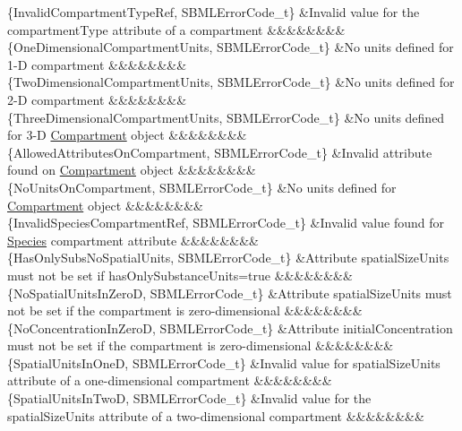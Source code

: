 \begin{DoxyParagraph}{}
\begin{longtabu}
\{Invalid\+Compartment\+Type\+Ref, S\+B\+M\+L\+Error\+Code\+\_\+t\} &Invalid value for the \textquotesingle{}compartment\+Type\textquotesingle{} attribute of a compartment &&&&&&&&\\
\{One\+Dimensional\+Compartment\+Units, S\+B\+M\+L\+Error\+Code\+\_\+t\} &No units defined for 1-\/D compartment &&&&&&&&\\
\{Two\+Dimensional\+Compartment\+Units, S\+B\+M\+L\+Error\+Code\+\_\+t\} &No units defined for 2-\/D compartment &&&&&&&&\\
\{Three\+Dimensional\+Compartment\+Units, S\+B\+M\+L\+Error\+Code\+\_\+t\} &No units defined for 3-\/D \hyperlink{class_compartment}{Compartment} object &&&&&&&&\\
\{Allowed\+Attributes\+On\+Compartment, S\+B\+M\+L\+Error\+Code\+\_\+t\} &Invalid attribute found on \hyperlink{class_compartment}{Compartment} object &&&&&&&&\\
\{No\+Units\+On\+Compartment, S\+B\+M\+L\+Error\+Code\+\_\+t\} &No units defined for \hyperlink{class_compartment}{Compartment} object &&&&&&&&\\
\{Invalid\+Species\+Compartment\+Ref, S\+B\+M\+L\+Error\+Code\+\_\+t\} &Invalid value found for \hyperlink{class_species}{Species} \textquotesingle{}compartment\textquotesingle{} attribute &&&&&&&&\\
\{Has\+Only\+Subs\+No\+Spatial\+Units, S\+B\+M\+L\+Error\+Code\+\_\+t\} &Attribute \textquotesingle{}spatial\+Size\+Units\textquotesingle{} must not be set if \textquotesingle{}has\+Only\+Substance\+Units\textquotesingle{}=\textquotesingle{}true\textquotesingle{} &&&&&&&&\\
\{No\+Spatial\+Units\+In\+ZeroD, S\+B\+M\+L\+Error\+Code\+\_\+t\} &Attribute \textquotesingle{}spatial\+Size\+Units\textquotesingle{} must not be set if the compartment is zero-\/dimensional &&&&&&&&\\
\{No\+Concentration\+In\+ZeroD, S\+B\+M\+L\+Error\+Code\+\_\+t\} &Attribute \textquotesingle{}initial\+Concentration\textquotesingle{} must not be set if the compartment is zero-\/dimensional &&&&&&&&\\
\{Spatial\+Units\+In\+OneD, S\+B\+M\+L\+Error\+Code\+\_\+t\} &Invalid value for \textquotesingle{}spatial\+Size\+Units\textquotesingle{} attribute of a one-\/dimensional compartment &&&&&&&&\\
\{Spatial\+Units\+In\+TwoD, S\+B\+M\+L\+Error\+Code\+\_\+t\} &Invalid value for the \textquotesingle{}spatial\+Size\+Units\textquotesingle{} attribute of a two-\/dimensional compartment &&&&&&&&\\

\end{longtabu}
\end{DoxyParagraph}
